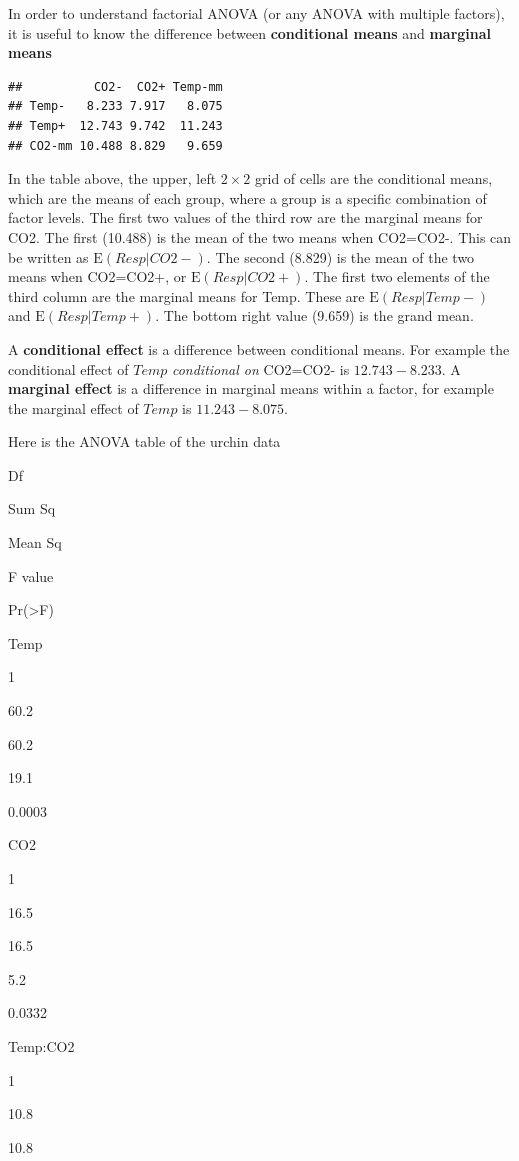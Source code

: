 \documentclass[]{book}
\begin{document}
In order to understand factorial ANOVA (or any ANOVA with multiple factors), it is useful to know the difference between \textbf{conditional means} and \textbf{marginal means}

\begin{verbatim}
##          CO2-  CO2+ Temp-mm
## Temp-   8.233 7.917   8.075
## Temp+  12.743 9.742  11.243
## CO2-mm 10.488 8.829   9.659
\end{verbatim}

In the table above, the upper, left \(2 \times 2\) grid of cells are the conditional means, which are the means of each group, where a group is a specific combination of factor levels. The first two values of the third row are the marginal means for CO2. The first (10.488) is the mean of the two means when CO2=CO2-. This can be written as \(\mathrm{E}(Resp|CO2-)\). The second (8.829) is the mean of the two means when CO2=CO2+, or \(\mathrm{E}(Resp|CO2+)\). The first two elements of the third column are the marginal means for Temp. These are \(\mathrm{E}(Resp|Temp-)\) and \(\mathrm{E}(Resp|Temp+)\). The bottom right value (9.659) is the grand mean.

A \textbf{conditional effect} is a difference between conditional means. For example the conditional effect of \(Temp\) \emph{conditional on} CO2=CO2- is \(12.743-8.233\). A \textbf{marginal effect} is a difference in marginal means within a factor, for example the marginal effect of \(Temp\) is \(11.243 - 8.075\).

Here is the ANOVA table of the urchin data

Df

Sum Sq

Mean Sq

F value

Pr(\textgreater F)

Temp

1

60.2

60.2

19.1

0.0003

CO2

1

16.5

16.5

5.2

0.0332

Temp:CO2

1

10.8

10.8
\end{document}
